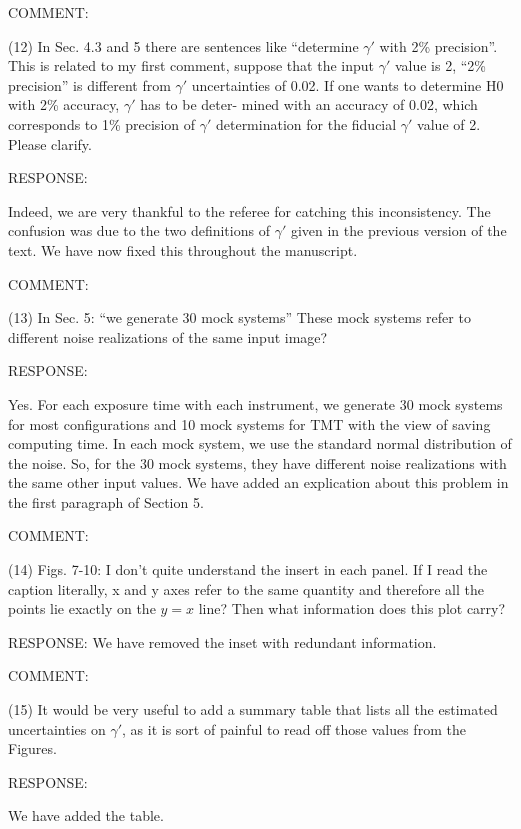 \documentclass[a4paper,11pt]{article}
\begin{document}
COMMENT:

(12) In Sec. 4.3 and 5 there are sentences like ``determine $\gamma'$
with 2\% precision''. This is related to my first comment, suppose
that the input $\gamma'$ value is 2, ``2\% precision'' is different
from $\gamma'$ uncertainties of 0.02. If one wants to determine H0
with 2\% accuracy, $\gamma'$ has to be deter- mined with an accuracy
of 0.02, which corresponds to 1\% precision of $\gamma'$ determination
for the fiducial $\gamma'$ value of 2. Please clarify.

RESPONSE: 

Indeed, we are very thankful to the referee for catching this
inconsistency. The confusion was due to the two definitions of
$\gamma'$ given in the previous version of the text. We have now fixed
this throughout the manuscript.


COMMENT:

(13) In Sec. 5: ``we generate 30 mock systems'' These mock systems 
refer to different noise realizations of the same input image?

RESPONSE:

Yes. For each exposure time with each instrument, we generate 30 mock systems 
for most configurations and 10 mock systems for TMT 
with the view of saving computing time. In each mock system, 
we use the standard normal distribution of the noise. So, for the 30 mock systems, 
they have different noise realizations with the same other input values. We have 
added an explication about this problem in the first paragraph of Section 5.


COMMENT:

(14) Figs. 7-10: I don't quite understand the insert in each panel. If
I read the caption literally, x and y axes refer to the same quantity
and therefore all the points lie exactly on the $y = x$ line? Then
what information does this plot carry?

RESPONSE:
We have removed the inset with redundant information.

COMMENT:

(15) It would be very useful to add a summary table that lists all the
estimated uncertainties on $\gamma'$, as it is sort of painful to read
off those values from the Figures.


RESPONSE:

We have added the table.
\end{document}
